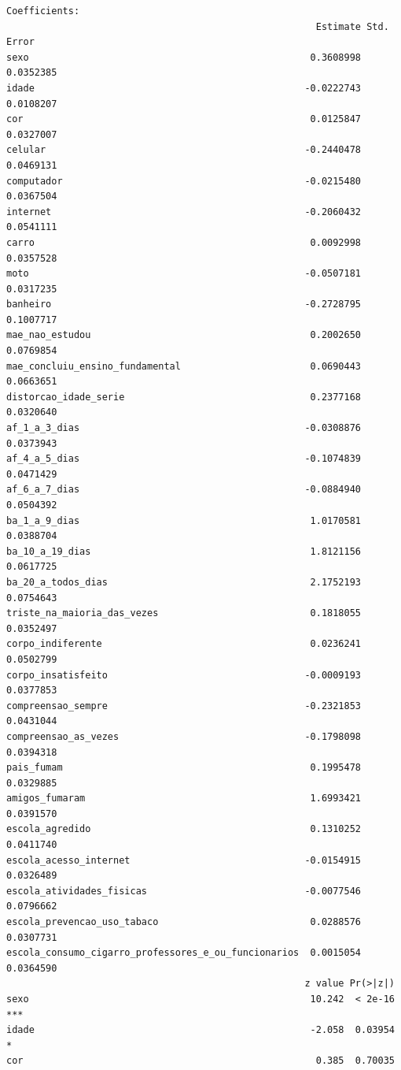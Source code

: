 \documentclass[
]{article}
\begin{document}
\begin{verbatim}
Coefficients:
                                                       Estimate Std. Error
sexo                                                  0.3608998  0.0352385
idade                                                -0.0222743  0.0108207
cor                                                   0.0125847  0.0327007
celular                                              -0.2440478  0.0469131
computador                                           -0.0215480  0.0367504
internet                                             -0.2060432  0.0541111
carro                                                 0.0092998  0.0357528
moto                                                 -0.0507181  0.0317235
banheiro                                             -0.2728795  0.1007717
mae_nao_estudou                                       0.2002650  0.0769854
mae_concluiu_ensino_fundamental                       0.0690443  0.0663651
distorcao_idade_serie                                 0.2377168  0.0320640
af_1_a_3_dias                                        -0.0308876  0.0373943
af_4_a_5_dias                                        -0.1074839  0.0471429
af_6_a_7_dias                                        -0.0884940  0.0504392
ba_1_a_9_dias                                         1.0170581  0.0388704
ba_10_a_19_dias                                       1.8121156  0.0617725
ba_20_a_todos_dias                                    2.1752193  0.0754643
triste_na_maioria_das_vezes                           0.1818055  0.0352497
corpo_indiferente                                     0.0236241  0.0502799
corpo_insatisfeito                                   -0.0009193  0.0377853
compreensao_sempre                                   -0.2321853  0.0431044
compreensao_as_vezes                                 -0.1798098  0.0394318
pais_fumam                                            0.1995478  0.0329885
amigos_fumaram                                        1.6993421  0.0391570
escola_agredido                                       0.1310252  0.0411740
escola_acesso_internet                               -0.0154915  0.0326489
escola_atividades_fisicas                            -0.0077546  0.0796662
escola_prevencao_uso_tabaco                           0.0288576  0.0307731
escola_consumo_cigarro_professores_e_ou_funcionarios  0.0015054  0.0364590
                                                     z value Pr(>|z|)    
sexo                                                  10.242  < 2e-16 ***
idade                                                 -2.058  0.03954 *  
cor                                                    0.385  0.70035    

\end{verbatim}
\end{document}
